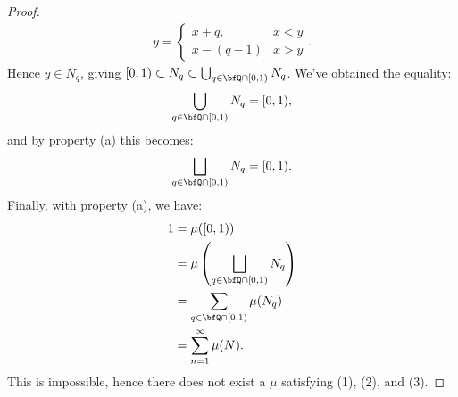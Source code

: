 \begin{proof}
                \begin{equation*}
                \begin{split}
                    y =
                    \begin{cases}
                        x+q, & x < y \\
                        x - (q-1) & x > y
                    \end{cases}.
                \end{split}
                \end{equation*}
            Hence $y \in N_q$, giving $[0,1) \subset N_q \subset \bigcup_{q \in \bfQ \cap [0,1)}N_q$. We've obtained the equality:
                \begin{equation*}
                \begin{split}
                    \bigcup_{q \in \bfQ \cap [0,1)}N_q = [0,1),
                \end{split}
                \end{equation*}
            and by property (a) this becomes:
                \begin{equation*}
                \begin{split}
                    \bigsqcup_{q \in \bfQ \cap [0,1)}N_q = [0,1).
                \end{split}
                \end{equation*}
            Finally, with property (a), we have:
                \begin{equation*}
                \begin{split}
                    1
                    & = \mu([0,1)) \\
                    & = \mu \left( \bigsqcup_{q \in \bfQ \cap [0,1)}N_q \right) \\
                    & = \sum_{q \in \bfQ \cap [0,1)}\mu(N_q) \\
                    & = \sum_{n = 1}^\infty \mu(N).
                \end{split}
                \end{equation*}
            This is impossible, hence there does not exist a $\mu$ satisfying (1), (2), and (3).
        \end{proof}

